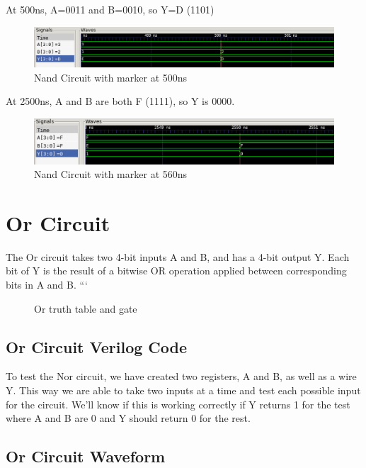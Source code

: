 \documentclass[12pt]{article}
\begin{document}
At 500ns, A=0011 and B=0010, so Y=D (1101) 
 \begin{figure}[H]
 \centering 
\includegraphics[width = 1.0\textwidth]{Nand/nand_wave1.png}
 \caption{Nand Circuit with marker at 500ns}
 \label{fig:enter-label}
 \end{figure}

At 2500ns, A and B are both F (1111), so Y is 0000. 
 \begin{figure}[H]
 \centering 
\includegraphics[width = 1.0\textwidth]{Nand/nand_wave2.png}
 \caption{Nand Circuit with marker at 560ns}
 \label{fig:enter-label}
 \end{figure}

 \section{Or Circuit}
 The Or circuit takes two 4-bit inputs A and B, and has a 4-bit output Y. Each bit of Y is the result of a bitwise OR operation applied between corresponding bits in A and B.
```\begin{figure}[H]
    \centering
    \caption{Or truth table and gate}
    \label{fig:shift-table}
\end{figure}

\subsection{Or Circuit Verilog Code}


To test the Nor circuit, we have created two registers, A and B, as well as a wire Y. This way we are able to take two inputs at a time and test each possible input for the circuit. We'll know if this is working correctly if Y returns 1 for the test where A and B are 0 and Y should return 0 for the rest.
%
\subsection{Or Circuit Waveform}
\end{document}
